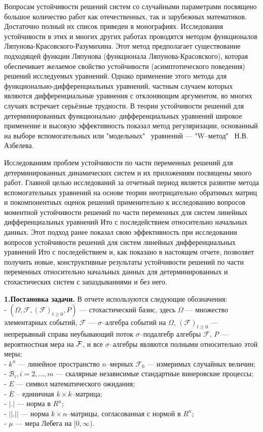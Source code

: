 Вопросам устойчивости решений систем со случайными параметрами
посвящено большое количество работ как отечественных, так и
зарубежных математиков. Достаточно полный их список приведен в
монографиях. Исследования устойчивости в этих и многих других
работах проводятся методом функционалов
Ляпунова-Красовского-Разумихина. Этот метод предполагает
существование подходящей функции Ляпунова (функционала
Ляпунова-Красовского), которая обеспечивает желаемое свойство
устойчивости (асимптотического поведения) решений исследуемых
уравнений. Однако применение этого метода для
функционально-дифференциальных уравнений, частным случаем которых
являются дифференциальные уравнения с отклоняющим аргументом, во
многих случаях встречает серьёзные трудности. В теории устойчивости
решений для детерминированных функционально--дифференциальных
уравнений широкое применение и высокую эффективность показал метод
регуляризации, основанный на выборе вспомогательных или "модельных"
{\,} уравнений  --- "W--метод" {\,} Н.В. Азбелева.

Исследованиям проблем устойчивости  по части переменных  решений для
детерминированных динамических систем и их приложениям посвящены
много работ. Главной целью исследований за отчетный период является
развитие метода вспомогательных уравнений на основе теории
неотрицательно обратимых матриц и покомпонентных оценок решений
применительно к исследованию вопросов моментной устойчивости решений
по части переменных для систем линейных дифференциальных уравнений
Ито с последействием относительно начальных данных. Этот подход
ранее показал свою эффективность при исследовании вопросов
устойчивости решений для систем линейных дифференциальных уравнений
Ито с последействием и, как показано в настоящем отчете, позволяет
получить новые, конструктивные результаты устойчивости решений по
части переменных относительно начальных данных для детерминированных
и стохастических систем с запаздываниями и без него.
\smallskip

\textbf{1.Постановка задачи.} В отчете используются
следующие обозначения:\\
 - $(\Omega , {\mathcal F}, ({\mathcal
F})_{t\ge0},P)$ --- стохастический базис, здесь $ \Omega $ ---
множество
 элементарных событий, ${\mathcal F}$ --- $\sigma$--алгебра событий на
 $\Omega$,  $({\mathcal F})_{t\ge 0}$ --- непрерывный справа неубывающий поток
 $\sigma$--подалгебр алгебры ${\mathcal F}$, $P$ --- вероятностная
 мера на ${\cal F}$, и  все $\sigma$--алгебры являются полными относительно этой
 меры;\\
-  $k^n$ --- линейное пространство $n$--мерных ${\mathcal F}_0$ ---
измеримых случайных величин;\\
- $\mathcal B_i,i=2,...,m$ --- скалярные независимые стандартные
винеровские процессы;\\
 -  $E$ --- символ математического
ожидания;\\
- $\bar E$ -- единичная $k \times k$--матрица;\\
-  $|.|$ --- норма в $R^n$;\\
- $||.||$
--- норма $k\times n$--матрицы, согласованная с нормой в $R^n$;\\
- $\mu$ --- мера Лебега на $[0,\infty)$.


